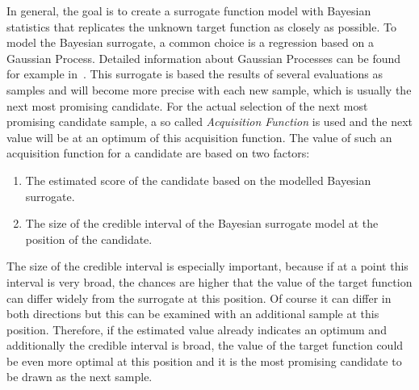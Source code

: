 In general, the goal is to create a surrogate function model with Bayesian statistics that replicates the unknown target function as closely as possible.
To model the Bayesian surrogate, a common choice is a regression based on a Gaussian Process.
Detailed information about Gaussian Processes can be found for example in~\cite{Rasmussen-Gaussian-Processes}.\newline
This surrogate is based the results of several evaluations as samples and will become more precise with each new sample, which is usually the next most promising candidate.
For the actual selection of the next most promising candidate sample, a so called \textit{Acquisition Function} is used and the next value will be at an optimum of this acquisition function.
The value of such an acquisition function for a candidate are based on two factors:
\begin{enumerate}
    \item The estimated score of the candidate based on the modelled Bayesian surrogate.
    \item The size of the credible interval of the Bayesian surrogate model at the position of the candidate.
\end{enumerate}
The size of the credible interval is especially important, because if at a point this interval is very broad, the chances are higher that the value of the target function can differ widely from the surrogate at this position.
Of course it can differ in both directions but this can be examined with an additional sample at this position.
Therefore, if the estimated value already indicates an optimum and additionally the credible interval is broad, the value of the target function could be even more optimal at this position and it is the most promising candidate to be drawn as the next sample.

